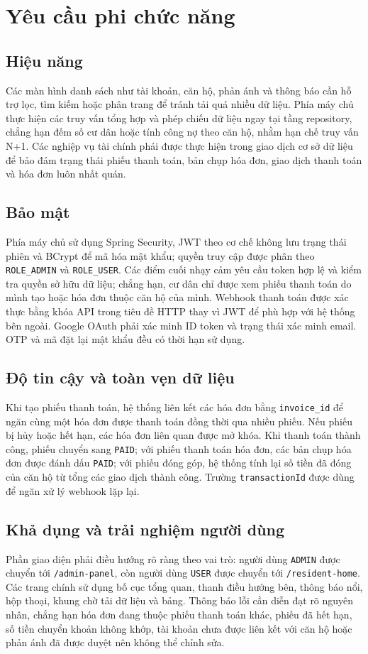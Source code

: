 ﻿\documentclass[12pt,a4paper]{report}
\begin{document}
\section{Yêu cầu phi chức năng}
\subsection{Hiệu năng}
Các màn hình danh sách như tài khoản, căn hộ, phản ánh và thông báo cần hỗ trợ lọc, tìm kiếm hoặc phân trang để tránh tải quá nhiều dữ liệu. Phía máy chủ thực hiện các truy vấn tổng hợp và phép chiếu dữ liệu ngay tại tầng repository, chẳng hạn đếm số cư dân hoặc tính công nợ theo căn hộ, nhằm hạn chế truy vấn N+1. Các nghiệp vụ tài chính phải được thực hiện trong giao dịch cơ sở dữ liệu để bảo đảm trạng thái phiếu thanh toán, bản chụp hóa đơn, giao dịch thanh toán và hóa đơn luôn nhất quán.

\subsection{Bảo mật}
Phía máy chủ sử dụng Spring Security, JWT theo cơ chế không lưu trạng thái phiên và BCrypt để mã hóa mật khẩu; quyền truy cập được phân theo \texttt{ROLE\_ADMIN} và \texttt{ROLE\_USER}. Các điểm cuối nhạy cảm yêu cầu token hợp lệ và kiểm tra quyền sở hữu dữ liệu; chẳng hạn, cư dân chỉ được xem phiếu thanh toán do mình tạo hoặc hóa đơn thuộc căn hộ của mình. Webhook thanh toán được xác thực bằng khóa API trong tiêu đề HTTP thay vì JWT để phù hợp với hệ thống bên ngoài. Google OAuth phải xác minh ID token và trạng thái xác minh email. OTP và mã đặt lại mật khẩu đều có thời hạn sử dụng.

\subsection{Độ tin cậy và toàn vẹn dữ liệu}
Khi tạo phiếu thanh toán, hệ thống liên kết các hóa đơn bằng \texttt{invoice\_id} để ngăn cùng một hóa đơn được thanh toán đồng thời qua nhiều phiếu. Nếu phiếu bị hủy hoặc hết hạn, các hóa đơn liên quan được mở khóa. Khi thanh toán thành công, phiếu chuyển sang \texttt{PAID}; với phiếu thanh toán hóa đơn, các bản chụp hóa đơn được đánh dấu \texttt{PAID}; với phiếu đóng góp, hệ thống tính lại số tiền đã đóng của căn hộ từ tổng các giao dịch thành công. Trường \texttt{transactionId} được dùng để ngăn xử lý webhook lặp lại.

\subsection{Khả dụng và trải nghiệm người dùng}
Phần giao diện phải điều hướng rõ ràng theo vai trò: người dùng \texttt{ADMIN} được chuyển tới \texttt{/admin-panel}, còn người dùng \texttt{USER} được chuyển tới \texttt{/resident-home}. Các trang chính sử dụng bố cục tổng quan, thanh điều hướng bên, thông báo nổi, hộp thoại, khung chờ tải dữ liệu và bảng. Thông báo lỗi cần diễn đạt rõ nguyên nhân, chẳng hạn hóa đơn đang thuộc phiếu thanh toán khác, phiếu đã hết hạn, số tiền chuyển khoản không khớp, tài khoản chưa được liên kết với căn hộ hoặc phản ánh đã được duyệt nên không thể chỉnh sửa.
\end{document}
